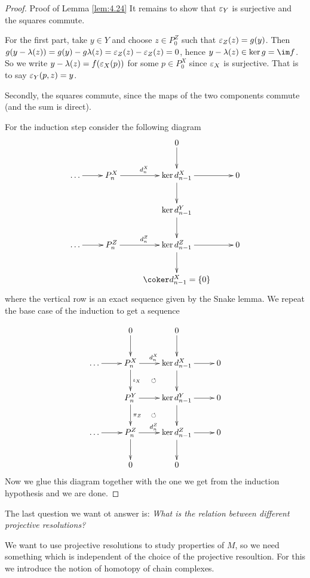 \documentclass[twoside = false,	%
		headsepline,		%
		parskip = true,
		]{scrbook}						%
\begin{document}
\begin{proof}{Proof of Lemma \ref{lem:4.24}}
       It remains to show that $\varepsilon_Y$ is surjective and the squares commute.
       
       For the first part, take $y \in Y$ and choose $z \in P_0^Z$ such that $\varepsilon_Z(z) = g(y)$. Then $g(y - \lambda (z)) = g(y) - g \lambda (z) = \varepsilon_Z(z) - \varepsilon_Z(z) = 0$, hence $y - \lambda(z) \in \ker g = \im f$. So we write $y-\lambda(z) = f(\varepsilon_X(p))$ for some $p \in P_0^X$ since $\varepsilon_X$ is surjective. That is to say $\varepsilon_Y(p,z) = y$.

       Secondly, the squares commute, since the maps of the two components commute (and the sum is direct).

        For the induction step consider the following diagram
        \begin{equation*}
        \xymatrix {
                        &                          & 0 \ar[d] \\
            \dots \ar[r] & P_{n}^X \ar[r]^{d_n^X} & \ker d_{n-1}^X \ar[r] \ar[d]& 0 \\
            & & \ker d_{n-1}^Y \ar[d] \\
            \dots \ar[r] & P_{n}^Z \ar[r]^{d_n^Z} & \ker d_{n-1}^Z \ar[r] \ar[d] & 0 \\
            & & \coker d_{n-1}^X = \{0\}
        }
        \end{equation*}
        where the vertical row is an exact sequence given by the Snake lemma. We repeat the base case of the induction to get a sequence
        
        \begin{equation*}
        \xymatrix {
                        &  0 \ar[d] & 0 \ar[d] \\
            \dots \ar[r] & P_{n}^X \ar[d]^{\iota_{X}} \ar[r]^{d_n^X} & \ker d_{n-1}^X \ar[r] \ar[d]& 0 \\
            & P_{n}^Y \ar@{}[ur]|{\circlearrowleft} \ar[r] \ar[d]^{\pi_Z}& \ker d_{n-1}^Y \ar[d] \ar[r] & 0 \\
            \dots \ar[r] & P_{n}^Z \ar[r]^{d_n^Z} \ar@{}[ur]|{\circlearrowleft} \ar[d] & \ker d_{n-1}^Z \ar[r] \ar[d] & 0 \\
            & 0 &  0
        }
        \end{equation*}
        Now we glue this diagram together with the one we get from the induction hypothesis and we are done.
    \end{proof}

    The last question we want ot answer is: \textit{What is the relation between different projective resolutions?}

    We want to use projective resolutions to study properties of $M$, so we need something which is independent of the choice of the projective resoultion. For this we introduce the notion of homotopy of chain complexes.

    
\printbibliography
\end{document}
